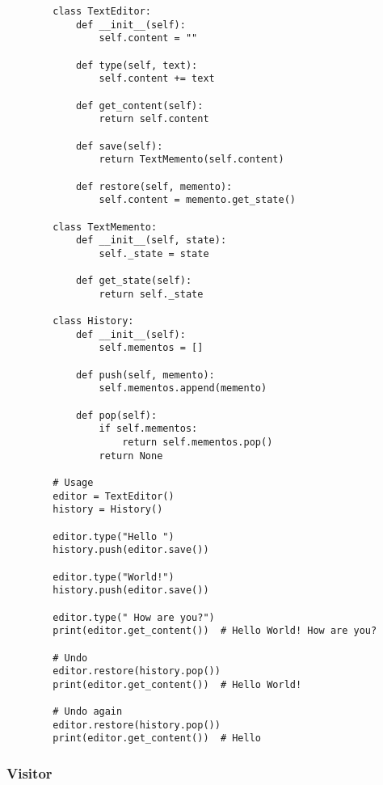     \begin{example}
      \begin{lstlisting}
        class TextEditor:
            def __init__(self):
                self.content = ""
            
            def type(self, text):
                self.content += text
            
            def get_content(self):
                return self.content
            
            def save(self):
                return TextMemento(self.content)
            
            def restore(self, memento):
                self.content = memento.get_state()

        class TextMemento:
            def __init__(self, state):
                self._state = state
            
            def get_state(self):
                return self._state

        class History:
            def __init__(self):
                self.mementos = []
            
            def push(self, memento):
                self.mementos.append(memento)
            
            def pop(self):
                if self.mementos:
                    return self.mementos.pop()
                return None

        # Usage
        editor = TextEditor()
        history = History()

        editor.type("Hello ")
        history.push(editor.save())

        editor.type("World!")
        history.push(editor.save())

        editor.type(" How are you?")
        print(editor.get_content())  # Hello World! How are you?

        # Undo
        editor.restore(history.pop())
        print(editor.get_content())  # Hello World!

        # Undo again
        editor.restore(history.pop())
        print(editor.get_content())  # Hello 
      \end{lstlisting}
    \end{example}

  \subsubsection{Visitor}

